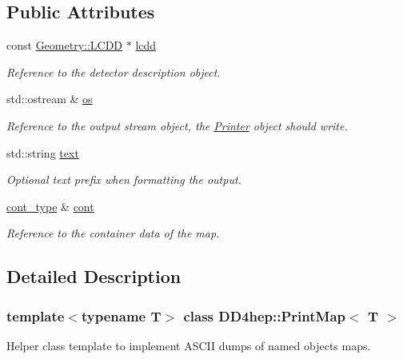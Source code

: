 \subsection*{Public Attributes}
\begin{DoxyCompactItemize}
\item 
const \hyperlink{class_d_d4hep_1_1_geometry_1_1_l_c_d_d}{Geometry\+::\+L\+C\+DD} $\ast$ \hyperlink{struct_d_d4hep_1_1_print_map_a7d3f9991b68729e077b0682903d5448d}{lcdd}
\begin{DoxyCompactList}\small\item\em Reference to the detector description object. \end{DoxyCompactList}\item 
std\+::ostream \& \hyperlink{struct_d_d4hep_1_1_print_map_af89e40c312ce2cf93e6956d3d03b704b}{os}
\begin{DoxyCompactList}\small\item\em Reference to the output stream object, the \hyperlink{struct_d_d4hep_1_1_printer}{Printer} object should write. \end{DoxyCompactList}\item 
std\+::string \hyperlink{struct_d_d4hep_1_1_print_map_ad776e7ab0023498d02708495e5dd0b1c}{text}
\begin{DoxyCompactList}\small\item\em Optional text prefix when formatting the output. \end{DoxyCompactList}\item 
\hyperlink{struct_d_d4hep_1_1_print_map_a75356a94ee86763170e76a2096ec4cb5}{cont\+\_\+type} \& \hyperlink{struct_d_d4hep_1_1_print_map_a5129907f452fc99969ce127ee6bb0f31}{cont}
\begin{DoxyCompactList}\small\item\em Reference to the container data of the map. \end{DoxyCompactList}\end{DoxyCompactItemize}


\subsection{Detailed Description}
\subsubsection*{template$<$typename T$>$\newline
class D\+D4hep\+::\+Print\+Map$<$ T $>$}

Helper class template to implement A\+S\+C\+II dumps of named objects maps. 

